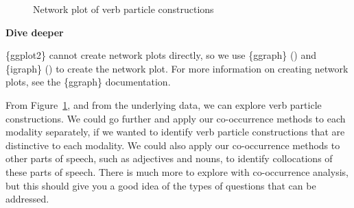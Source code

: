 \documentclass[
  letterpaper,
  krantz1]{latex/krantz-mod}
\theoremstyle{definition}
\theoremstyle{definition}
\theoremstyle{remark}
\begin{document}
\begin{figure}[!htb]


\caption{\label{fig-explore-masc-verb-part-network}Network plot of verb
particle constructions}

\end{figure}%

\begin{tcolorbox}[enhanced jigsaw, toprule=.15mm, breakable, colback=white, arc=.35mm, left=2mm, colframe=quarto-callout-color-frame, opacityback=0, bottomrule=.15mm, rightrule=.15mm, leftrule=.75mm]

\textbf{ Dive deeper}

\{ggplot2\} cannot create network plots directly, so we use \{ggraph\}
() and \{igraph\}
() to create the network
plot. For more information on creating network plots, see the \{ggraph\}
documentation.

\end{tcolorbox}

From Figure~\ref{fig-explore-masc-verb-part-network}, and from the
underlying data, we can explore verb particle constructions. We could go
further and apply our co-occurrence methods to each modality separately,
if we wanted to identify verb particle constructions that are
distinctive to each modality. We could also apply our co-occurrence
methods to other parts of speech, such as adjectives and nouns, to
identify collocations of these parts of speech. There is much more to
explore with co-occurrence analysis, but this should give you a good
idea of the types of questions that can be addressed.
\end{document}
